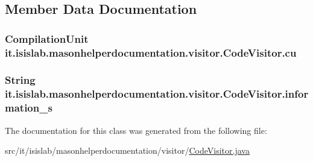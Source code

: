\subsection{Member Data Documentation}
\hypertarget{classit_1_1isislab_1_1masonhelperdocumentation_1_1visitor_1_1_code_visitor_af9088f73f92fd3640698ad4e660f042b}{
\subsubsection[{cu}]{\setlength{\rightskip}{0pt plus 5cm}Compilation\-Unit it.\-isislab.\-masonhelperdocumentation.\-visitor.\-Code\-Visitor.\-cu\hspace{0.3cm}{\ttfamily [private]}}}\label{classit_1_1isislab_1_1masonhelperdocumentation_1_1visitor_1_1_code_visitor_af9088f73f92fd3640698ad4e660f042b}
\hypertarget{classit_1_1isislab_1_1masonhelperdocumentation_1_1visitor_1_1_code_visitor_a8bfc263e47218ff87b62a5ad9b1294e7}{
\subsubsection[{information\-\_\-s}]{\setlength{\rightskip}{0pt plus 5cm}String it.\-isislab.\-masonhelperdocumentation.\-visitor.\-Code\-Visitor.\-information\-\_\-s\hspace{0.3cm}{\ttfamily [private]}}}\label{classit_1_1isislab_1_1masonhelperdocumentation_1_1visitor_1_1_code_visitor_a8bfc263e47218ff87b62a5ad9b1294e7}


The documentation for this class was generated from the following file\-:\begin{DoxyCompactItemize}
\item 
src/it/isislab/masonhelperdocumentation/visitor/\hyperlink{_code_visitor_8java}{Code\-Visitor.\-java}\end{DoxyCompactItemize}
